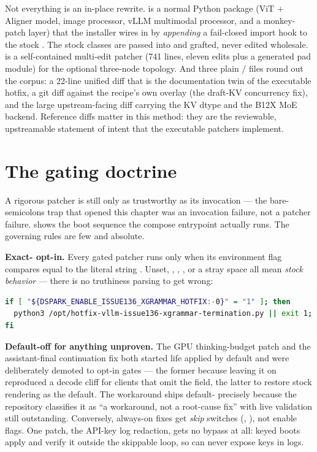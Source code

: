Not everything is an in-place rewrite.  is a
normal Python package (ViT + Aligner model, image processor, vLLM multimodal
processor, and a monkey-patch layer) that the installer
 wires in by \emph{appending} a
fail-closed import hook to the stock . The stock
classes are passed into  and grafted, never edited
wholesale.  is a self-contained
multi-edit patcher (741 lines, eleven edits plus a generated pad module) for
the optional three-node topology. And three plain /
files round out the corpus: a 22-line unified diff that is the documentation
twin of the executable  hotfix, a git diff against the
recipe's own overlay (the draft-KV concurrency fix), and the large
upstream-facing diff carrying the  KV dtype and the B12X
MoE backend. Reference diffs matter in this method: they are the reviewable,
upstreamable statement of intent that the executable patchers implement.

\section{The gating doctrine}
\label{sec:patches-gating}

A rigorous patcher is still only as trustworthy as its invocation --- the
bare-semicolons trap that opened this chapter was an invocation failure, not
a patcher failure.  shows the boot sequence the
compose entrypoint actually runs. The governing rules are few and absolute.

\textbf{Exact- opt-in.} Every gated patcher runs only when its
environment flag compares equal to the literal string . Unset,
, , , or a stray space all mean \emph{stock
behavior} --- there is no truthiness parsing to get wrong:

\begin{lstlisting}[language=bash]
if [ "${DSPARK_ENABLE_ISSUE136_XGRAMMAR_HOTFIX:-0}" = "1" ]; then
  python3 /opt/hotfix-vllm-issue136-xgrammar-termination.py || exit 1;
fi
\end{lstlisting}

\textbf{Default-off for anything unproven.} The  GPU
thinking-budget patch and the assistant-final continuation fix both started
life applied by default and were deliberately demoted to opt-in gates ---
the former because leaving it on reproduced a decode cliff for clients that
omit the field, the latter to restore stock rendering as the default. The
 workaround ships default- precisely because the
repository classifies it as ``a workaround, not a root-cause fix'' with live
validation still outstanding. Conversely, always-on fixes get \emph{skip}
switches (,
), not enable flags. One patch,
the API-key log redaction, gets no bypass at all: keyed boots apply and
verify it outside the skippable loop, so 
can never expose keys in logs.

